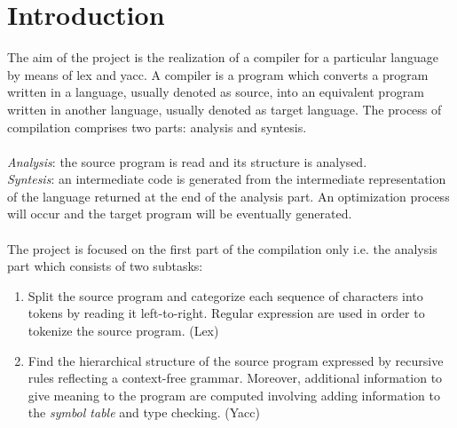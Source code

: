 \documentclass[12pt]{article}
\begin{document}
\section{Introduction}
\vspace{0.5cm}
The aim of the project is the realization of a compiler for a particular language by means of lex and yacc. A compiler is a program which converts a program written in a language, usually denoted as source, into an equivalent program written in another language, usually denoted as target language. The process of compilation comprises two parts: analysis and syntesis.\\\\
\textit{Analysis}: the source program is read and its structure is analysed.\\
\textit{Syntesis}: an intermediate code is generated from the intermediate representation of the language returned at the end of the analysis part. An optimization process will occur and the target program will be eventually generated.\\\\
The project is focused on the first part of the compilation only i.e. the analysis part which consists of two subtasks:
\begin{enumerate}
\item Split the source program and categorize each sequence of characters into tokens by reading it left-to-right. Regular expression are used in order to tokenize the source program. (Lex)
\item Find the hierarchical structure of the source program expressed by recursive rules reflecting a context-free grammar. Moreover, additional information to give meaning to the program are computed involving adding information to the \textit{symbol table} and type checking. (Yacc)
\end{enumerate}
\vspace{1.7cm}




\end{document}
